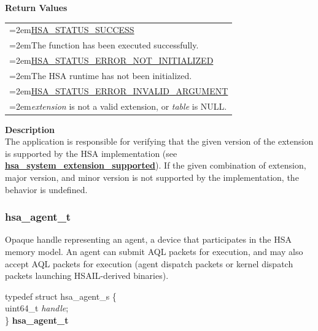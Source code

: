 \documentclass[final,oneside]{book}
\newcommand{\reffun}[1]{\textbf{#1}}
\newcommand{\reffld}[1]{\textit{#1}}
\newenvironment{mylongtable}{\rowcolors{0}{lightgray}{lightgray}\longtable} {
\endlongtable}
\begin{document}
\vspace{-2mm}\textbf{Return Values}\\[-7mm]
\noindent\begin{longtable}{@{}>{\hangindent=2em}p{\linewidth}}
\hyperlink{group__status_1ggad755322e7ff95456520e8abdbe90d225ae382ea0c9c05cce5a60d0317375159cc}{HSA_\-STATUS_\-SUCCESS}\\\hspace{2em}The function has been executed successfully.\\[2mm]
\hyperlink{group__status_1ggad755322e7ff95456520e8abdbe90d225a34ea59ade5bfce95eee935238a99f5b5}{HSA_\-STATUS_\-ERROR_\-NOT_\-INITIALIZED}\\\hspace{2em}The HSA runtime has not been initialized.\\[2mm]
\hyperlink{group__status_1ggad755322e7ff95456520e8abdbe90d225ac7d3651f75107d2a6a8ba3b25683c030}{HSA_\-STATUS_\-ERROR_\-INVALID_\-ARGUMENT}\\\hspace{2em}\textit{extension} is not a valid extension, or \textit{table} is NULL.
\end{longtable}
\vspace{-2mm}\noindent\textbf{Description}\\
The application is responsible for verifying that the given version of the extension is supported by the HSA implementation (see \hyperlink{group__agentinfo_1gaa91b6a637e7105225aae29ce0cc25812}{\reffun{hsa_\-system_\-extension_\-supported}}). If the given combination of extension, major version, and minor version is not supported by the implementation, the behavior is undefined. 


\subsubsection{hsa_\-agent_\-t}
\vspace{-2.5mm}Opaque handle representing an agent, a device that participates in the HSA memory model. An agent can submit AQL packets for execution, and may also accept AQL packets for execution (agent dispatch packets or kernel dispatch packets launching HSAIL-derived binaries).\begin{mylongtable}{@{}p{\textwidth}}
\rule{0pt}{3ex}typedef struct  hsa_agent_s \{\\
\hspace{1.7em}uint64_\-t \reffld{handle};\\
\}  \hypertarget{group__agentinfo_1gab8db3fb886332a24acac08ec361e1d86}{\textbf{hsa_\-agent_\-t}}\rule[-2ex]{0pt}{0pt}
\end{mylongtable}
\end{document}
